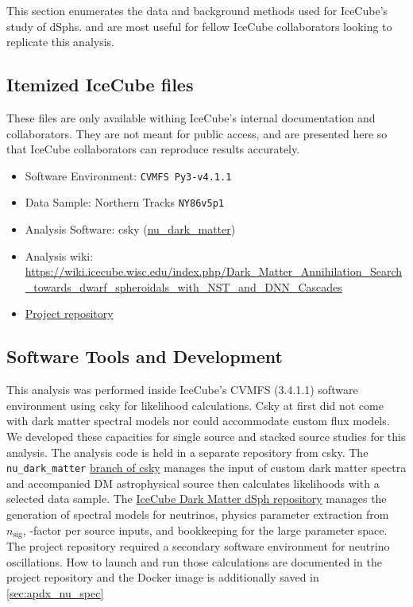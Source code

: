 This section enumerates the data and background methods used for IceCube's study of dSphs.
 and  are most useful for fellow IceCube collaborators looking to replicate this analysis.

\subsection{Itemized IceCube files}\label{sec:icDM_data}

These files are only available withing IceCube's internal documentation and collaborators.
They are not meant for public access, and are presented here so that IceCube collaborators can reproduce results accurately.

\begin{itemize}
    \item Software Environment: \texttt{CVMFS Py3-v4.1.1}
    \item Data Sample: Northern Tracks \texttt{NY86v5p1}
    \item Analysis Software: csky (\href{https://github.com/icecube/csky/tree/nu\_dark\_matter}{nu\_dark\_matter})
    \item Analysis wiki: \url{https://wiki.icecube.wisc.edu/index.php/Dark\_Matter\_Annihilation\_Search\_towards\_dwarf\_spheroidals\_with\_NST\_and\_DNN\_Cascades}
    \item \href{https://github.com/salaza82/IceCube_dark_matter_dsph}{Project repository}
\end{itemize}

\subsection{Software Tools and Development}\label{sec:icDM_tools}


This analysis was performed inside IceCube's CVMFS (3.4.1.1) software environment using csky for likelihood calculations.
Csky at first did not come with dark matter spectral models nor could accommodate custom flux models.
We developed these capacities for single source and stacked source studies for this analysis.
The analysis code is held in a separate repository from csky.
The \texttt{nu\_dark\_matter} \href{https://github.com/icecube/csky/tree/nu\_dark\_matter}{branch of csky} manages the input of custom dark matter spectra and accompanied DM astrophysical source then calculates likelihoods with a selected data sample.
The \href{https://github.com/salaza82/IceCube_dark_matter_dsph}{IceCube Dark Matter dSph repository} manages the generation of spectral models for neutrinos, physics parameter extraction from $n_{\mathrm{sig}}$, \J-factor per source inputs, and bookkeeping for the large parameter space.
The project repository required a secondary software environment for neutrino oscillations.
How to launch and run those calculations are documented in the project repository and the Docker image is additionally saved in \cref{sec:apdx_nu_spec}

